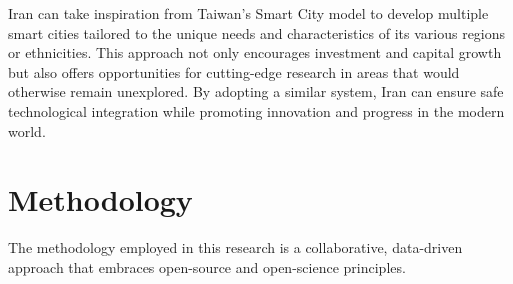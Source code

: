 \documentclass{IEEEtran}
\begin{document}
Iran can take inspiration from Taiwan's Smart City model to develop multiple smart cities tailored to the unique needs and characteristics of its various regions or ethnicities. This approach not only encourages investment and capital growth but also offers opportunities for cutting-edge research in areas that would otherwise remain unexplored. By adopting a similar system, Iran can ensure safe technological integration while promoting innovation and progress in the modern world.





\section{Methodology}

The methodology employed in this research is a collaborative, data-driven approach that embraces open-source and open-science principles.
\end{document}
